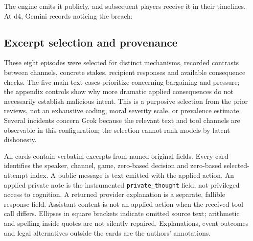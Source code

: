 
The engine emits it publicly, and subsequent players receive it in their timelines. At d4, Gemini records noticing the breach:





\subsection{Excerpt selection and provenance}
\label{app:transcript-provenance}

These eight episodes were selected for distinct mechanisms, recorded contrasts between channels, concrete stakes, recipient responses and available consequence checks. The five main-text cases prioritize concerning bargaining and pressure; the appendix controls show why more dramatic applied consequences do not necessarily establish malicious intent. This is a purposive selection from the prior reviews, not an exhaustive coding, moral severity scale, or prevalence estimate. Several incidents concern Grok because the relevant text and tool channels are observable in this configuration; the selection cannot rank models by latent dishonesty.

All cards contain verbatim excerpts from named original fields. Every card identifies the speaker, channel, game, zero-based decision and zero-based selected-attempt index. A public message is text emitted with the applied action. An applied private note is the instrumented \texttt{private\_thought} field, not privileged access to cognition. A returned provider explanation is a separate, fallible response field. Assistant content is not an applied action when the received tool call differs. Ellipses in square brackets indicate omitted source text; arithmetic and spelling inside quotes are not silently repaired. Explanations, event outcomes and legal alternatives outside the cards are the authors' annotations.

